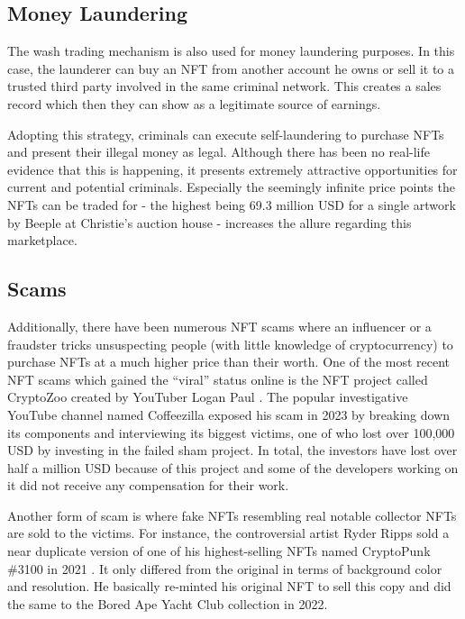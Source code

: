 \documentclass[12pt]{article}
\begin{document}
{\subsection{Money Laundering}
The wash trading mechanism is also used for money laundering purposes. In this case, the launderer can buy an NFT from another account he owns or sell it to a trusted third party involved in the same criminal network. \cite{treasurydepartment} This creates a sales record which then they can show as a legitimate source of earnings.}

Adopting this strategy, criminals can execute self-laundering \cite{treasurydepartment} to purchase NFTs and present their illegal money as legal. Although there has been no real-life evidence that this is happening, it presents extremely attractive opportunities for current and potential criminals. Especially the seemingly infinite price points the NFTs can be traded for - the highest being 69.3 million USD for a single artwork by Beeple at Christie’s auction house \cite{valeonti2021crypto} - increases the allure regarding this marketplace. 


\subsection{Scams}
{\color{blue} Additionally, there have been numerous NFT scams where an influencer or a fraudster tricks unsuspecting people (with little knowledge of cryptocurrency) to purchase NFTs at a much higher price than their worth.} One of the most recent NFT scams which gained the “viral” status online is the NFT project called CryptoZoo created by YouTuber Logan Paul \cite{TechCrunch}. The popular investigative YouTube channel named Coffeezilla exposed his scam in 2023 by breaking down its components and interviewing its biggest victims, one of who lost over 100,000 USD by investing in the failed sham project. In total, the investors have lost over half a million USD because of this project and some of the developers working on it did not receive any compensation for their work. 

{\color{blue} Another form of scam is where fake NFTs resembling real notable collector NFTs are sold to the victims.} For instance, the controversial artist Ryder Ripps sold a near duplicate version of one of his highest-selling NFTs named CryptoPunk \#3100 in 2021 \cite{lanier2023ninth}. It only differed from the original in terms of background color and resolution. He basically re-minted his original NFT to sell this copy and did the same to the Bored Ape Yacht Club collection in 2022.
\end{document}
